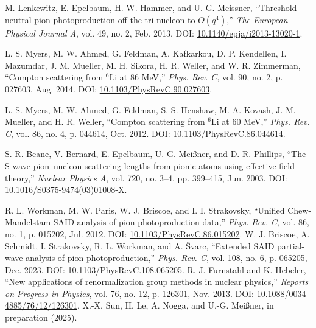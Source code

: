 \documentclass[a4paper,11pt]{article}
\begin{document}
\begin{thebibliography}{99}
M. Lenkewitz, E. Epelbaum, H.-W. Hammer, and U.-G. Meissner,
``Threshold neutral pion photoproduction off the tri-nucleon to
$O(q^4)$,'' \textit{The European Physical Journal A}, vol. 49, no.
2, Feb. 2013. DOI:
\href{http://dx.doi.org/10.1140/epja/i2013-13020-1}{10.1140/epja/i2013-13020-1}.

L. S. Myers, M. W. Ahmed, G. Feldman, A. Kafkarkou, D. P.
Kendellen, I. Mazumdar, J. M. Mueller, M. H. Sikora, H. R. Weller,
and W. R. Zimmerman, ``Compton scattering from $^{6}\mathrm{Li}$ at
86 MeV,'' \textit{Phys. Rev. C}, vol. 90, no. 2, p. 027603, Aug.
2014. DOI:
\href{https://link.aps.org/doi/10.1103/PhysRevC.90.027603}{10.1103/PhysRevC.90.027603}.

L. S. Myers, M. W. Ahmed, G. Feldman, S. S. Henshaw, M. A. Kovash,
J. M. Mueller, and H. R. Weller, ``Compton scattering from $^{6}$Li
at 60 MeV,'' \textit{Phys. Rev. C}, vol. 86, no. 4, p. 044614, Oct.
2012. DOI:
\href{https://link.aps.org/doi/10.1103/PhysRevC.86.044614}{10.1103/PhysRevC.86.044614}.

S. R. Beane, V. Bernard, E. Epelbaum, U.-G. Meißner, and D. R.
Phillips, ``The S-wave pion–nucleon scattering lengths from pionic
atoms using effective field theory,'' \textit{Nuclear Physics A},
vol. 720, no. 3–4, pp. 399–415, Jun. 2003. DOI:
\href{http://dx.doi.org/10.1016/S0375-9474(03)01008-X}{10.1016/S0375-9474(03)01008-X}.

R. L. Workman, M. W. Paris, W. J. Briscoe, and I. I. Strakovsky,
``Unified Chew-Mandelstam SAID analysis of pion photoproduction
data,'' \textit{Phys. Rev. C}, vol. 86, no. 1, p. 015202, Jul.
2012. DOI:
\href{https://link.aps.org/doi/10.1103/PhysRevC.86.015202}{10.1103/PhysRevC.86.015202}.
W. J. Briscoe, A. Schmidt, I. Strakovsky, R. L. Workman, and A.
\ifmmode {}\else \v{S}\fi{}varc, ``Extended SAID
partial-wave analysis of pion photoproduction,'' \textit{Phys. Rev.
C}, vol. 108, no. 6, p. 065205, Dec. 2023. DOI:
\href{https://link.aps.org/doi/10.1103/PhysRevC.108.065205}{10.1103/PhysRevC.108.065205}.
R. J. Furnstahl and K. Hebeler, ``New applications of
renormalization group methods in nuclear physics,'' \textit{Reports
on Progress in Physics}, vol. 76, no. 12, p. 126301, Nov. 2013.
DOI:
\href{http://dx.doi.org/10.1088/0034-4885/76/12/126301}{10.1088/0034-4885/76/12/126301}.
X.-X. Sun, H. Le, A. Nogga, and U.-G. Meißner, in preparation (2025).


\end{thebibliography}
\end{document}
